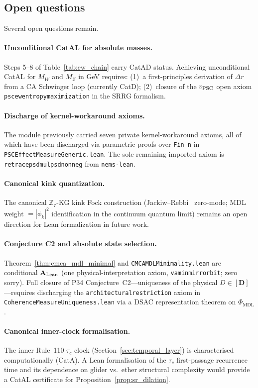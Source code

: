 \documentclass[11pt]{article}
\theoremstyle{remark}
\newcommand{\PHIMDL}{\Phi_{\mathrm{MDL}}}
\newcommand{\ZS}{\mathbb{Z}_7}
\newcommand{\lean}[1]{%
  \penalty-100
  \begingroup\def\_{\textunderscore\allowbreak}\texttt{#1}\endgroup}
\newcommand{\Mw}{M_W}
\newcommand{\Mz}{M_Z}
\newcommand{\vPSC}{v_{\rm PSC}}
\newcommand{\CatAL}{\ensuremath{\textbf{A}_{\rm Lean}}}
\begin{document}
\subsection{Open questions}
\label{ssec:open}

Several open questions remain.

\paragraph{Unconditional CatAL for absolute masses.}
Steps 5--8 of Table~\ref{tab:ew_chain} carry CatAD status.  Achieving
unconditional CatAL for $\Mw$ and $\Mz$ in GeV requires: (1)~a
first-principles derivation of $\Delta r$ from a CA Schwinger loop
(currently CatD); (2)~closure of the $\vPSC$ open axiom
\lean{psc\_ew\_entropy\_maximization} in the SRRG formalism.

\paragraph{Discharge of kernel-workaround axioms.}
The module previously carried seven private kernel-workaround axioms, all of
which have been discharged via parametric proofs over \lean{Fin n} in
\lean{PSCEffectMeasureGeneric.lean}.
The sole remaining imported axiom is
\lean{re\_trace\_psd\_mul\_psd\_nonneg} from \lean{nems-lean}.

\paragraph{Canonical kink quantization.}
The canonical $\ZS$-KG kink Fock construction (Jackiw--Rebbi~\cite{JackiwTeitelboim1985}
zero-mode; MDL weight $=|\phi_k|^2$ identification in the continuum quantum
limit) remains an open direction for Lean formalization in future work.

\paragraph{Conjecture C2 and absolute state selection.}
Theorem~\ref{thm:cmca_mdl_minimal} and \lean{CMCAMDLMinimality.lean} are
conditional \CatAL{} (one physical-interpretation axiom, \lean{va\_min\_mirror\_bit};
zero sorry).
Full closure of P34 Conjecture~C2---uniqueness of the physical
$D\in[\mathbf{D}]$---requires discharging the \lean{architectural\_restriction}
axiom in \lean{CoherenceMeasureUniqueness.lean} via a DSAC representation
theorem on $\PHIMDL$.

\paragraph{Canonical inner-clock formalisation.}
The inner Rule~110 $\tau_c$ clock (Section~\ref{sec:temporal_layer}) is
characterised computationally (CatA).  A Lean formalisation of the $\tau_c$
first-passage recurrence time and its dependence on glider vs.\ ether
structural complexity would provide a CatAL certificate for
Proposition~\ref{prop:sr_dilation}.
\end{document}
